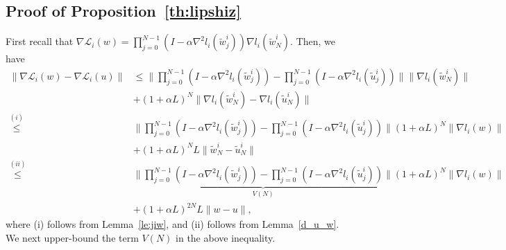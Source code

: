\documentclass{osudissert96}
\begin{document}
\subsection*{Proof of Proposition~\ref{th:lipshiz}}
	First recall that {\small$\nabla \mathcal{L}_i(w) =   \prod_{j=0}^{N-1}(I-\alpha \nabla^2 l_i(\widetilde w^i_{j}))\nabla l_i( \widetilde w^i _{N})$}. Then, we have 
	{\small
	\begin{align}\label{delff}
	\|\nabla \mathcal{L}_i(w) - \nabla \mathcal{L}_i(u)\| 
	 &\leq  \Big\| \prod_{j=0}^{N-1}(I-\alpha \nabla^2 l_i(\widetilde w^i_{j})) -  \prod_{j=0}^{N-1}(I-\alpha \nabla^2 l_i(\widetilde u^i_{j}))\Big\|\big\|\nabla l_i( \widetilde w^i _{N})\big\|   \nonumber
	\\ &+ (1+\alpha L)^N \|\nabla l_i( \widetilde w^i _{N})  - \nabla l_i( \widetilde u^i _{N}) \| \nonumber
	\\ \overset{(i)}\leq&  \Big\| \prod_{j=0}^{N-1}(I-\alpha \nabla^2 l_i(\widetilde w^i_{j})) -  \prod_{j=0}^{N-1}(I-\alpha \nabla^2 l_i(\widetilde u^i_{j}))\Big\|(1+\alpha L)^N\big\|\nabla l_i( w)\big\|   \nonumber
	\\ &+ (1+\alpha L)^N L \|\widetilde w^i _{N} - \widetilde u^i _{N} \| \nonumber
	\\ \overset{(ii)}\leq&  \underbrace{\Big\| \prod_{j=0}^{N-1}(I-\alpha \nabla^2 l_i(\widetilde w^i_{j})) -  \prod_{j=0}^{N-1}(I-\alpha \nabla^2 l_i(\widetilde u^i_{j}))\Big\|}_{V(N)}(1+\alpha L)^N\big\|\nabla l_i( w)\big\|   \nonumber
	\\ &+ (1+\alpha L)^{2N} L \|w-u\|,
	\end{align}}
\hspace{-0.15cm}where (i) follows from Lemma~\ref{le:jiw}, and (ii) follows from Lemma~\ref{d_u_w}.
	We next upper-bound the term $V(N)$ in the above inequality. 
\end{document}
